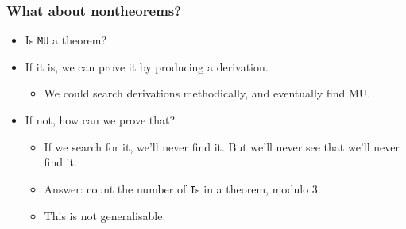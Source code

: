 \documentclass[mathserif]{beamer}
\begin{document}
\begin{frame}
\frametitle{What about nontheorems?}
\label{sec-2-3}

\pause
\begin{itemize}

\item Is \texttt{MU} a theorem?\pause\\
\label{sec-2-3-1}%
\item If it is, we can prove it by producing a derivation.\pause
\label{sec-2-3-2}%
\begin{itemize}

\item We could search derivations methodically, and eventually find MU.\pause\\
\label{sec-2-3-2-1}%
\end{itemize} %

\item If not, how can we prove that?\pause
\label{sec-2-3-3}%
\begin{itemize}

\item If we search for it, we'll never find it. But we'll never see that we'll never find it.\pause\\
\label{sec-2-3-3-1}%
\item Answer: count the number of \texttt{I}s in a theorem, modulo 3.\pause\\
\label{sec-2-3-3-2}%
\item This is not generalisable.\\
\label{sec-2-3-3-3}%
\end{itemize} %
\end{itemize} %
\end{frame}
\end{document}
